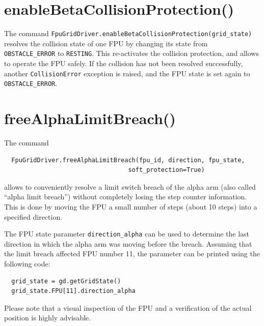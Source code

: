 \documentclass[fontsize=12,a4paper]{scrreprt}
\begin{document}
\section{enableBetaCollisionProtection()}

The command \texttt{FpuGridDriver.enableBetaCollisionProtection(grid\_state)}
resolves the collision state of one FPU by changing
its state from \texttt{OBSTACLE\_ERROR} to \texttt{RESTING}.  This
re-activates the collision protection, and allows to operate the FPU
safely. If the collision has not been resolved successfully, another
\texttt{CollisionError} exception is raised, and the FPU state is set
again to \texttt{OBSTACLE\_ERROR}.



\section{freeAlphaLimitBreach()}

The command
\begin{verbatim}
  FpuGridDriver.freeAlphaLimitBreach(fpu_id, direction, fpu_state,
                                  soft_protection=True)
\end{verbatim}
allows to conveniently resolve a limit switch breach of the alpha arm
(also called ``alpha limit breach'') without completely losing the
step counter information. This is done by moving the FPU a small
number of steps (about 10 steps) into a specified direction.

%
The FPU state parameter \texttt{direction\_alpha} can be used to
determine the last direction in which the alpha arm was moving before
the breach. Assuming that the limit breach affected FPU number 11,
the parameter can be printed using the following code:

\begin{verbatim}
  grid_state = gd.getGridState()
  grid_state.FPU[11].direction_alpha
\end{verbatim}


Please note that a visual inspection of the FPU and a
verification of the actual position is highly advisable.
\end{document}
